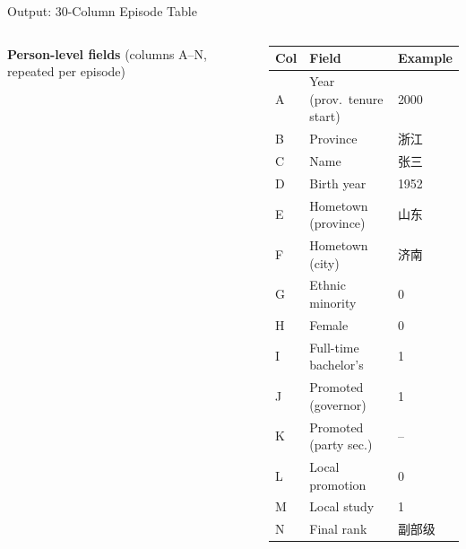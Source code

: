 \documentclass[aspectratio=169, 10pt]{beamer}
\begin{document}
\begin{frame}[shrink=5]{Output: 30-Column Episode Table}
  \begin{columns}[T]
    \textbf{Person-level fields} (columns A–N, repeated per episode)
    \begin{center}
    \scriptsize
    \begin{tabular}{lll}
      \toprule
      Col & Field & Example \\
      \midrule
      A & Year (prov.\ tenure start) & 2000 \\
      B & Province & 浙江 \\
      C & Name & 张三 \\
      D & Birth year & 1952 \\
      E & Hometown (province) & 山东 \\
      F & Hometown (city) & 济南 \\
      G & Ethnic minority & 0 \\
      H & Female & 0 \\
      I & Full-time bachelor's & 1 \\
      J & Promoted (governor) & 1 \\
      K & Promoted (party sec.) & -- \\
      L & Local promotion & 0 \\
      M & Local study & 1 \\
      N & Final rank & 副部级 \\
      \bottomrule
    \end{tabular}
    \end{center}


\end{columns}
\end{frame}
\end{document}
